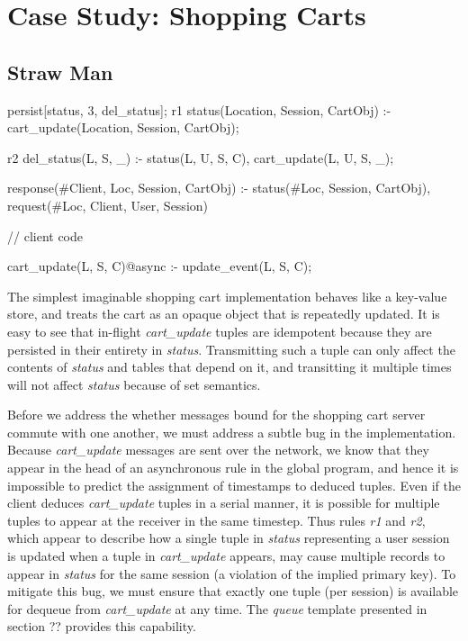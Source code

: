 \section{Case Study: Shopping Carts}


\subsection{Straw Man}

\begin{Dedalus}
persist[status, 3, del_status];
r1
status(Location, Session, CartObj) :-
    cart_update(Location,  Session, CartObj);
    
r2
del_status(L, S, _) :-
    status(L, U, S, C),
    cart_update(L, U, S, _);

response(#Client, Loc, Session, CartObj) :-
    status(#Loc, Session, CartObj),
    request(#Loc, Client, User, Session)

// client code

cart_update(L, S, C)@async :- 
    update_event(L, S, C);

\end{Dedalus}

The simplest imaginable shopping cart implementation behaves like a key-value store,
and treats the cart as an opaque object that is repeatedly updated.  It is easy to see that
in-flight {\em cart\_update} tuples are idempotent because they are persisted in their entirety
in {\em status}.  Transmitting such a tuple can only affect the contents of {\em status} and tables that depend on it, and transitting it multiple times will not affect {\em status} because of set
semantics.

Before we address the whether messages bound for the shopping cart server commute 
with one another, we must address a subtle bug in the implementation.  Because {\em cart\_update}
messages are sent over the network, we know that they appear in the head of an asynchronous 
rule in the global program, and hence it is impossible to predict the assignment of timestamps
to deduced tuples.  Even if the client deduces {\em cart\_update} tuples in a serial manner, it
is possible for multiple tuples to appear at the receiver in the same timestep.  Thus rules {\em r1} 
and {\em r2}, which appear to describe how a single tuple in {\em status} representing a user
session is updated when a tuple in {\em cart\_update} appears, may cause multiple records
to appear in {\em status} for the same session (a violation of the implied primary key).
To mitigate this bug, we must ensure that exactly one tuple (per session) is available for dequeue
from {\em cart\_update} at any time.  The \emph{queue} template presented in section ?? 
provides this capability.

